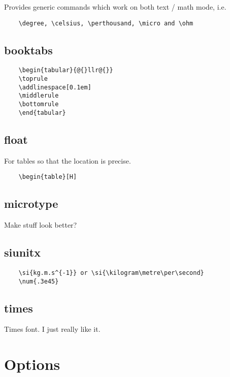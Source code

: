 \documentclass{article}
\begin{document}
Provides generic commands which work on both text / math mode, i.e.

\begin{verbatim}
	\degree, \celsius, \perthousand, \micro and \ohm
\end{verbatim}

\subsection{booktabs}

\begin{verbatim}
	\begin{tabular}{@{}llr@{}}
	\toprule
	\addlinespace[0.1em]
	\middlerule
	\bottomrule
	\end{tabular}
\end{verbatim}

\subsection{float}

For tables so that the location is precise.
	
\begin{verbatim}
	\begin{table}[H]
\end{verbatim}


\subsection{microtype}

Make stuff look better?

\subsection{siunitx}

\begin{verbatim}
	\si{kg.m.s^{-1}} or \si{\kilogram\metre\per\second}
	\num{.3e45} 
\end{verbatim}

\subsection{times}

Times font. I just really like it.

\section{Options}
\end{document}
